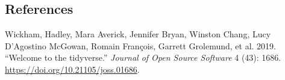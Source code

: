 \documentclass[
]{article}
\newlength{\cslhangindent}
\newlength{\cslentryspacingunit} %
\newenvironment{CSLReferences}[2] %
 {%
  \setlength{\parindent}{0pt}
  \ifodd #1
  \let\oldpar\par
  \def\par{\hangindent=\cslhangindent\oldpar}
  \fi
  \setlength{\parskip}{#2\cslentryspacingunit}
 }%
 {}
\begin{document}
\hypertarget{references}{%
\subsection*{References}\label{references}}

\hypertarget{refs}{}
\begin{CSLReferences}{1}{0}
\leavevmode{}%
Wickham, Hadley, Mara Averick, Jennifer Bryan, Winston Chang, Lucy
D'Agostino McGowan, Romain François, Garrett Grolemund, et al. 2019.
{``Welcome to the {tidyverse}.''} \emph{Journal of Open Source Software}
4 (43): 1686. \url{https://doi.org/10.21105/joss.01686}.

\end{CSLReferences}
\end{document}
